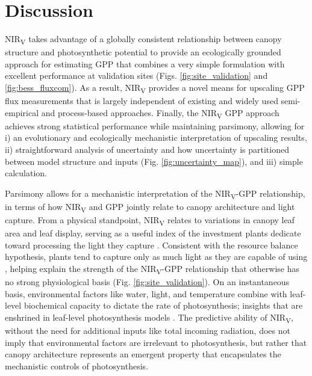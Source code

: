 \documentclass[10pt,letterpaper]{article}
\begin{document}
\section*{Discussion}
NIR\textsubscript{V} takes advantage of a globally consistent relationship between canopy structure and photosynthetic potential to provide  an ecologically grounded approach for estimating GPP that combines a very simple formulation with excellent performance at validation sites (Figs. \ref{fig:site_validation} and \ref{fig:bess_fluxcom}). As a result, NIR\textsubscript{V} provides a novel means for  upscaling GPP flux measurements  that is largely independent of existing and widely used semi-empirical and process-based approaches. Finally, the NIR\textsubscript{V} GPP approach achieves strong statistical performance while maintaining parsimony, allowing for i) an evolutionary and ecologically mechanistic interpretation of upscaling results, ii) straightforward analysis of uncertainty and how uncertainty is partitioned between model structure and inputs (Fig. \ref{fig:uncertainty_map}), and iii) simple calculation.

Parsimony allows for a mechanistic interpretation of the NIR\textsubscript{V}-GPP relationship, in terms of how NIR\textsubscript{V} and GPP jointly relate to canopy architecture and light capture. From a physical standpoint, NIR\textsubscript{V} relates to variations in canopy leaf area and leaf display, serving as a useful index of the investment plants dedicate toward processing the light they capture \cite{Badgley2017}. Consistent with the resource balance hypothesis, plants tend to capture only as much light as they are capable of using \cite{Field1991}, helping explain the strength of the NIR\textsubscript{V}-GPP relationship that otherwise has no strong physiological basis (Fig. \ref{fig:site_validation}). On an instantaneous basis, environmental factors like water, light, and temperature combine with leaf-level biochemical capacity to dictate the rate of photosynthesis; insights that are enshrined in leaf-level photosynthesis models \cite{FvCB}.  The predictive ability of NIR\textsubscript{V}, without the need for additional inputs like total incoming radiation, does not imply that environmental factors are irrelevant to photosynthesis, but rather that canopy architecture represents an emergent property that encapsulates the mechanistic controls of photosynthesis.
\end{document}

